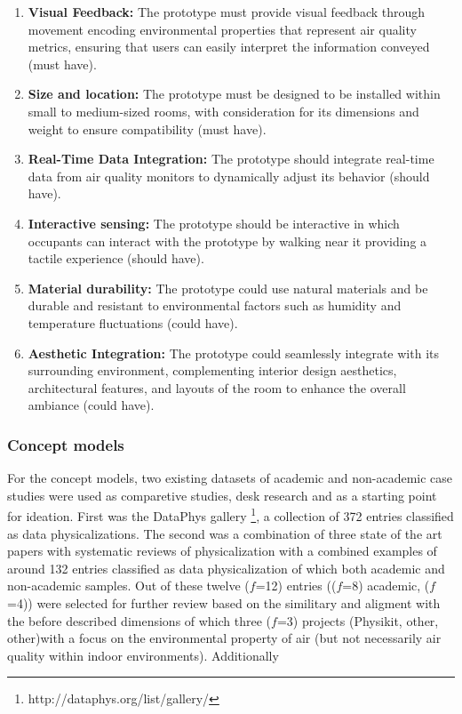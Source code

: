 \begin{enumerate}
    \renewcommand{\labelenumi}{R\arabic{enumi}:}
    \item \textbf{Visual Feedback:} The prototype must provide visual feedback through movement encoding environmental properties that represent air quality metrics, ensuring that users can easily interpret the information conveyed (must have).
    \item \textbf{Size and location:} The prototype must be designed to be installed within small to medium-sized rooms, with consideration for its dimensions and weight to ensure compatibility (must have).
    \item \textbf{Real-Time Data Integration:} The prototype should integrate real-time data from air quality monitors to dynamically adjust its behavior (should have).
    \item \textbf{Interactive sensing:} The prototype should be interactive in which occupants can interact with the prototype by walking near it providing a tactile experience (should have).
    \item \textbf{Material durability:} The prototype could use natural materials and be durable and resistant to environmental factors such as humidity and temperature fluctuations (could have).
    \item \textbf{Aesthetic Integration:} The prototype could seamlessly integrate with its surrounding environment, complementing interior design aesthetics, architectural features, and layouts of the room to enhance the overall ambiance (could have).
\end{enumerate}

\subsubsection{Concept models}

For the concept models, two existing datasets of academic and non-academic case studies were used as comparetive studies, desk research and as a starting point for ideation. First was the DataPhys gallery \footnote{http://dataphys.org/list/gallery/}, a collection of 372 entries classified as data physicalizations. The second was a combination of three state of the art papers with systematic reviews of physicalization with a combined examples of around 132 entries classified as data physicalization of which both academic and non-academic samples. Out of these twelve ($f$=12) entries (($f$=8) academic, ($f$=4)) were selected for further review based on the similitary and aligment with the  before described dimensions of which three ($f$=3) projects (Physikit, other, other)with a focus on the environmental property of air (but not necessarily air quality within indoor environments). Additionally 

